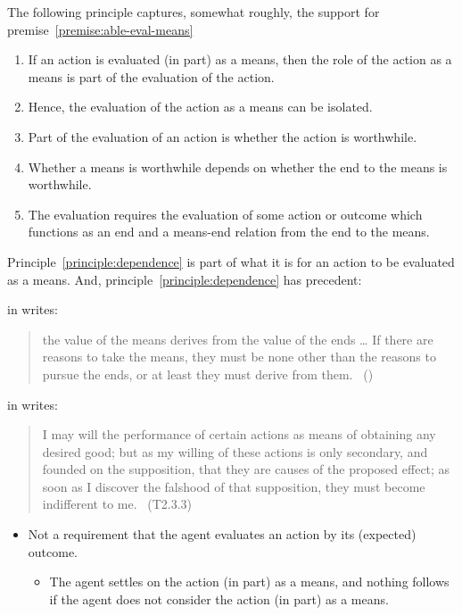 \documentclass[10pt]{article}
\newcommand{\hand}{\ding{43}}
\begin{document}
The following principle captures, somewhat roughly, the support for premise~\ref{premise:able-eval-means}

\principleMEdependence*

\begin{enumerate}
\item If an action is evaluated (in part) as a means, then the role of the action as a means is part of the evaluation of the action.
\item Hence, the evaluation of the action as a means can be isolated.
\item Part of the evaluation of an action is whether the action is worthwhile.
\item Whether a means is worthwhile depends on whether the end to the means is worthwhile.
\item The evaluation requires the evaluation of some action or outcome which functions as an end and a means-end relation from the end to the means.
\end{enumerate}

Principle~\ref{principle:dependence} is part of what it is for an action to be evaluated as a means.
And, principle~\ref{principle:dependence} has precedent:

\citeauthor{Raz:2005aa} in  writes:
\begin{quote}
    the value of the means derives from the value of the ends \dots
    If there are reasons to take the means, they must be none other than the reasons to pursue the ends, or at least they must derive from them.\nolinebreak
  \mbox{ }\hfill(\cite[2]{Raz:2005aa})
\end{quote}

\citeauthor{Hume:2011aa} in  writes:

\begin{quote}
  I may will the performance of certain actions as means of obtaining any desired good; but as my willing of these actions is only secondary, and founded on the supposition, that they are causes of the proposed effect; as soon as I discover the falshood of that supposition, they must become indifferent to me.\nolinebreak
  \mbox{ }\hfill\mbox{\hfill(T2.3.3)}
\end{quote}

\begin{itemize}
\item[\hand] Not a requirement that the agent evaluates an action by its (expected) outcome.
  \begin{itemize}
  \item The agent settles on the action (in part) as a means, and nothing follows if the agent does not consider the action (in part) as a means.
  \end{itemize}
\end{itemize}
\end{document}
